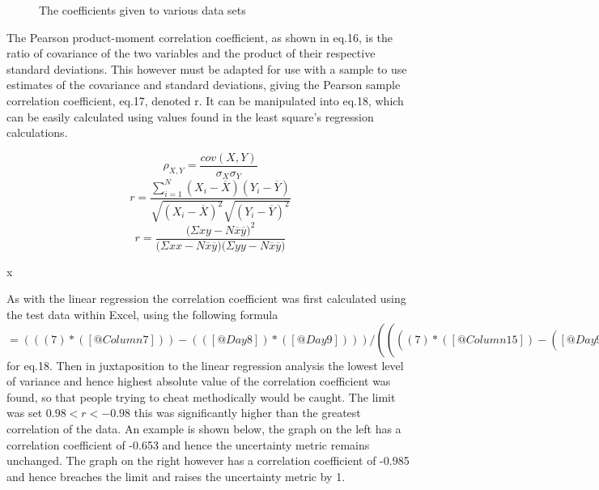 \documentclass[11pt]{article}
\begin{document}
\begin{figure}
\centering 
{}
\caption{The coefficients given to various data sets \cite{linregex} \label{correx}}
\end{figure}

The Pearson product-moment correlation coefficient, as shown in eq.16, is the ratio of covariance of the two variables and the product of their respective standard deviations. This however must be adapted for use with a sample to use estimates of the covariance and standard deviations, giving the Pearson sample correlation coefficient, eq.17, denoted r. It can be manipulated into eq.18, which can be easily calculated using values found in the least square's regression calculations.

\begin{figure}[h!] 
\begin{equation}
\rho_{X,Y} = \frac{cov(X,Y)}{\sigma_X\sigma_Y}
\end{equation}
\endminipage\hfill
{}
\begin{equation}
r = \frac{\sum\limits_{i=1}^N (X_i - \overline{X})(Y_i - \overline{Y})}{\sqrt{(X_i - \overline{X})^2}\sqrt{(Y_i - \overline{Y})^2}}
\end{equation}
\begin{equation}
r = \frac{\big(\Sigma xy - N\overline{x}\overline{y}\big)^2}{\big(\Sigma xx - N\overline{x}\overline{y}\big)\big(\Sigma yy - N\overline{x} \overline{y}\big)}
\end{equation}
\endminipage
\end{figure} x

As with the linear regression the correlation coefficient was first calculated using the test data within Excel, using the following formula $=(((7)*([@Column7]))-(([@Day8])*([@Day9])))/((((7)*([@Column15])-([@Day9]^2))^(0.5))*(((7)*([@Column158])-(([@Day8])^2))^(0.5)))$ for eq.18. Then in juxtaposition to the linear regression analysis the lowest level of variance and hence highest absolute value of the correlation coefficient was found, so that people trying to cheat methodically would be caught. The limit was set $0.98<r<-0.98$ this was significantly higher than the greatest correlation of the data. An example is shown below, the graph on the left has a correlation coefficient of -0.653 and hence the uncertainty metric remains unchanged. The graph on the right however has a correlation coefficient of -0.985 and hence breaches the limit and raises the uncertainty metric by 1. 
\end{document}
